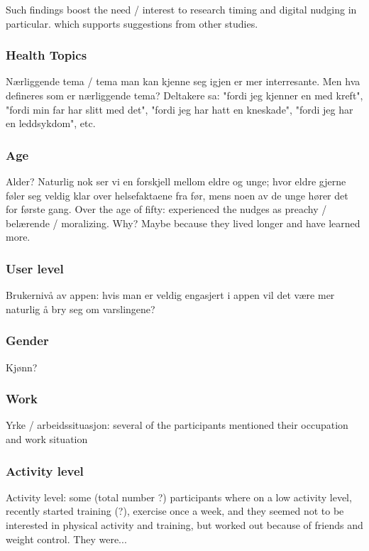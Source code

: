 Such findings boost the need / interest to research timing and digital nudging in particular. which supports suggestions from other studies. 

\subsubsection{Health Topics}
Nærliggende tema / tema man kan kjenne seg igjen er mer interresante. Men hva defineres som er nærliggende tema? Deltakere sa: "fordi jeg kjenner en med kreft", "fordi min far har slitt med det", "fordi jeg har hatt en kneskade", "fordi jeg har en leddsykdom", etc. 

\subsubsection{Age}
Alder? Naturlig nok ser vi en forskjell mellom eldre og unge; hvor eldre gjerne føler seg veldig klar over helsefaktaene fra før, mens noen av de unge hører det for første gang. 
Over the age of fifty: experienced the nudges as preachy / belærende / moralizing. Why? Maybe because they lived longer and have learned more. 

\subsubsection{User level}
Brukernivå av appen: hvis man er veldig engasjert i appen vil det være mer naturlig å bry seg om varslingene?

\subsubsection{Gender}
Kjønn?

\subsubsection{Work}
Yrke / arbeidssituasjon: several of the participants mentioned their occupation and work situation

\subsubsection{Activity level}
Activity level: some (total number ?) participants where on a low activity level, recently started training (?), exercise once a week, and they seemed not to be interested in physical activity and training, but worked out because of friends and weight control. They were... 

